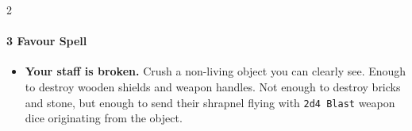 \begin{multicols*}{2}
\paragraph{3 Favour Spell}
\begin{itemize}
    \item [\ding{108}] \textbf{Your staff is broken.} Crush a non-living object you can clearly see. Enough to destroy wooden shields and weapon handles. 
    Not enough to destroy bricks and stone, but enough to send their shrapnel flying with \texttt{2d4 Blast} weapon dice originating from the object.

    
    
\end{itemize}


\end{multicols*}
